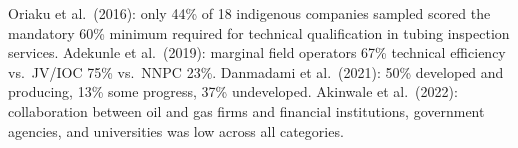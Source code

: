 Oriaku et al.~(2016): only 44\% of 18 indigenous companies sampled
scored the mandatory 60\% minimum required for technical qualification
in tubing inspection services. Adekunle et al.~(2019): marginal field
operators 67\% technical efficiency vs.~JV/IOC 75\% vs.~NNPC 23\%.
Danmadami et al.~(2021): 50\% developed and producing, 13\% some
progress, 37\% undeveloped. Akinwale et al.~(2022): collaboration
between oil and gas firms and financial institutions, government
agencies, and universities was low across all categories.
